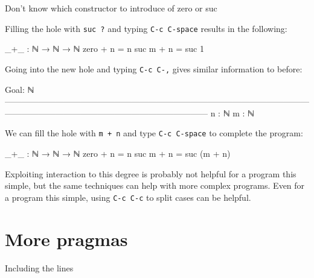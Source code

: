 \begin{myDisplay}
Don't know which constructor to introduce of zero or suc
\end{myDisplay}

Filling the hole with \texttt{suc\ ?} and typing \texttt{C-c\ C-space}
results in the following:

\begin{myDisplay}
_+_ : ℕ → ℕ → ℕ
zero + n = n
suc m + n = suc { }1
\end{myDisplay}

Going into the new hole and typing \texttt{C-c\ C-,} gives similar
information to before:

\begin{myDisplay}
Goal: ℕ
————————————————————————————————————————————————————————————
n : ℕ
m : ℕ
\end{myDisplay}

We can fill the hole with \texttt{m\ +\ n} and type
\texttt{C-c\ C-space} to complete the program:

\begin{myDisplay}
_+_ : ℕ → ℕ → ℕ
zero + n = n
suc m + n = suc (m + n)
\end{myDisplay}

Exploiting interaction to this degree is probably not helpful for a
program this simple, but the same techniques can help with more complex
programs. Even for a program this simple, using \texttt{C-c\ C-c} to
split cases can be helpful.

\hypertarget{more-pragmas}{%
\section{More pragmas}\label{more-pragmas}}

Including the lines

\begin{fence}
\begin{code}%
\>[0]\AgdaSymbol{\{-\#}\AgdaSpace{}%
\AgdaSpace{}%
\AgdaSpace{}%
\AgdaOperator{\AgdaPrimitive{\AgdaUnderscore{}+\AgdaUnderscore{}}}\AgdaSpace{}%
\AgdaSymbol{\#-\}}\<%
\\
\>[0]\AgdaSymbol{\{-\#}\AgdaSpace{}%
\AgdaSpace{}%
\AgdaSpace{}%
\AgdaOperator{\AgdaPrimitive{\AgdaUnderscore{}*\AgdaUnderscore{}}}\AgdaSpace{}%
\AgdaSymbol{\#-\}}\<%
\\
\>[0]\AgdaSymbol{\{-\#}\AgdaSpace{}%
\AgdaSpace{}%
\AgdaSpace{}%
\AgdaSpace{}%
\AgdaSymbol{\#-\}}\<%
\end{code}
\end{fence}

